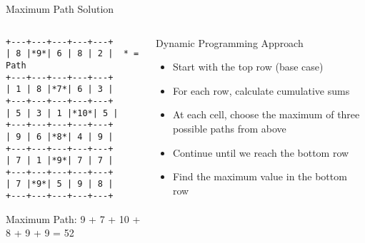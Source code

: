 \documentclass{beamer}
\begin{document}
\begin{frame}{Maximum Path Solution}
    \begin{columns}
        \begin{column}{0.5\textwidth}
            \begin{lstlisting}[basicstyle=\ttfamily\small]
+---+---+---+---+---+
| 8 |*9*| 6 | 8 | 2 |  * = Path
+---+---+---+---+---+
| 1 | 8 |*7*| 6 | 3 |
+---+---+---+---+---+
| 5 | 3 | 1 |*10*| 5 |
+---+---+---+---+---+
| 9 | 6 |*8*| 4 | 9 |
+---+---+---+---+---+
| 7 | 1 |*9*| 7 | 7 |
+---+---+---+---+---+
| 7 |*9*| 5 | 9 | 8 |
+---+---+---+---+---+
            \end{lstlisting}
            \begin{center}
                Maximum Path: 9 + 7 + 10 + 8 + 9 + 9 = 52
            \end{center}
        \end{column}
        \begin{column}{0.5\textwidth}
            \begin{block}{Dynamic Programming Approach}
                \begin{itemize}
                    \item Start with the top row (base case)
                    \item For each row, calculate cumulative sums
                    \item At each cell, choose the maximum of three possible paths from above
                    \item Continue until we reach the bottom row
                    \item Find the maximum value in the bottom row
                \end{itemize}
            \end{block}
        \end{column}
    \end{columns}
\end{frame}
\end{document}
